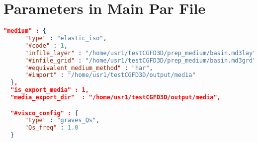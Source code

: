 \section{Parameters in Main Par File} \label{sec_medium_json} 

\begin{lstlisting}[language=json,
    label={lst_medium_json},
    caption=Example of medium settings in .json,
    frame=tb]
  "medium" : {
      "type" : "elastic_iso",
      "#code" : 1,
      "infile_layer" : "/home/usr1/testCGFD3D/prep_medium/basin.md3lay",
      "#infile_grid" : "/home/usr1/testCGFD3D/prep_medium/basin.md3grd",
      "#equivalent_medium_method" : "har",
      "#import" : "/home/usr1/testCGFD3D/output/media"
  },
  "is_export_media" : 1,
  "media_export_dir"  : "/home/usr1/testCGFD3D/output/media",

  "#visco_config" : {
      "type" : "graves_Qs",
      "Qs_freq" : 1.0
  }
\end{lstlisting}

